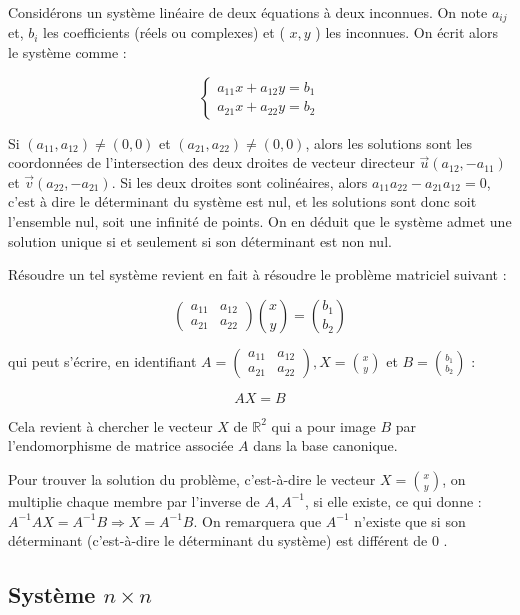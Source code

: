 Considérons un système linéaire de deux équations à deux inconnues. On note $a_{i j}$ et, $b_i$ les coefficients (réels ou complexes) et ( $x, y$ ) les inconnues. On écrit alors le système comme :

$$
\left\{\begin{array}{l}
a_{11} x+a_{12} y=b_1 \\
a_{21} x+a_{22} y=b_2
\end{array}\right.
$$


Si $\left(a_{11}, a_{12}\right) \neq(0,0)$ et $\left(a_{21}, a_{22}\right) \neq(0,0)$, alors les solutions sont les coordonnées de l'intersection des deux droites de vecteur directeur $\vec{u}\left(a_{12},-a_{11}\right)$ et $\vec{v}\left(a_{22},-a_{21}\right)$. Si les deux droites sont colinéaires, alors $a_{11} a_{22}-a_{21} a_{12}=0$, c'est à dire le déterminant du système est nul, et les solutions sont donc soit l'ensemble nul, soit une infinité de points. On en déduit que le système admet une solution unique si et seulement si son déterminant est non nul.

Résoudre un tel système revient en fait à résoudre le problème matriciel suivant :

$$
\left(\begin{array}{ll}
a_{11} & a_{12} \\
a_{21} & a_{22}
\end{array}\right)\binom{x}{y}=\binom{b_1}{b_2}
$$

qui peut s'écrire, en identifiant $A=\left(\begin{array}{ll}a_{11} & a_{12} \\ a_{21} & a_{22}\end{array}\right), X=\binom{x}{y}$ et $B=\binom{b_1}{b_2}$ :

$$
A X=B
$$


Cela revient à chercher le vecteur $X$ de $\mathbb{R}^2$ qui a pour image $B$ par l'endomorphisme de matrice associée $A$ dans la base canonique.

Pour trouver la solution du problème, c'est-à-dire le vecteur $X=\binom{x}{y}$, on multiplie chaque membre par l'inverse de $A, A^{-1}$, si elle existe, ce qui donne : $A^{-1} A X=A^{-1} B \Longrightarrow X=A^{-1} B$. On remarquera que $A^{-1}$ n'existe que si son déterminant (c'est-à-dire le déterminant du système) est différent de 0 .

\subsection{Système $n \times n$}

